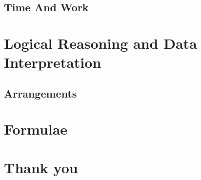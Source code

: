 \documentclass{book}
\begin{document}
% 

\chapter{Time And Work}




\part{Logical Reasoning and Data Interpretation}

\chapter{Arrangements}





\part{Formulae}


\part{Thank you}
\end{document}
